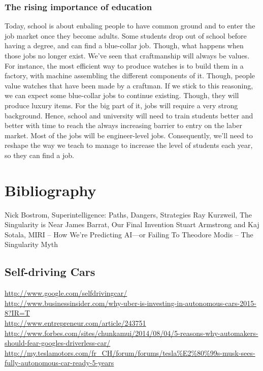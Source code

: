 \documentclass[12pt]{article}
\begin{document}
\subsubsection{The rising importance of education}

Today, school is about enbaling people to have common ground and to enter the job market once they become adults. Some students drop out of school before having a degree, and can find a blue-collar job. Though, what happens when those jobs no longer exist.
We've seen that craftmanship will always be values. For instance, the most efficient way to produce watches is to build them in a factory, with machine assembling the different components of it. Though, people value watches that have been made by a craftman. If we stick to this reasoning, we can expect some blue-collar jobs to continue existing. Though, they will produce luxury items.
For the big part of it, jobs will require a very strong background. Hence, school and university will need to train students better and better with time to reach the always increasing barrier to entry on the laber market. Most of the jobs will be engineer-level jobs.
Consequently, we'll need to reshape the way we teach to manage to increase the level of students each year, so they can find a job.


\section{Bibliography}
Nick Bostrom, Superintelligence: Paths, Dangers, Strategies
Ray Kurzweil, The Singularity is Near
James Barrat, Our Final Invention
Stuart Armstrong and Kaj Sotala, MIRI – How We’re Predicting AI—or Failing To
Theodore Modis – The Singularity Myth

\subsection{Self-driving Cars}
\url{http://www.google.com/selfdrivingcar/}\\
\url{http://www.businessinsider.com/why-uber-is-investing-in-autonomous-cars-2015-8?IR=T}\\
\url{http://www.entrepreneur.com/article/243751}\\
\url{http://www.forbes.com/sites/chunkamui/2014/08/04/5-reasons-why-automakers-should-fear-googles-driverless-car/}\\
\url{http://my.teslamotors.com/fr_CH/forum/forums/tesla%E2%80%99s-musk-sees-fully-autonomous-car-ready-5-years}\\
\end{document}
